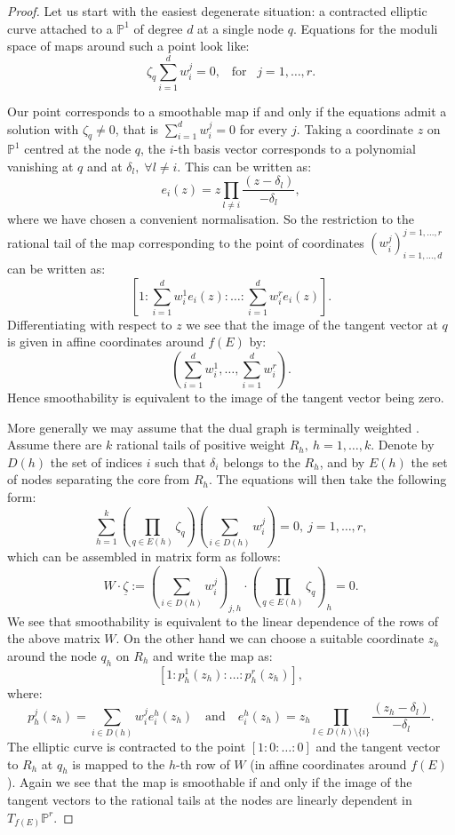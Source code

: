 \documentclass[11pt]{amsart}
\newcommand{\PP}{\mathbb P}
\theoremstyle{plain}
\theoremstyle{definition}
\begin{document}
\begin{proof}
 Let us start with the easiest degenerate situation: a contracted elliptic curve attached to a $\PP^1$ of degree $d$ at a single node $q$. Equations for the moduli space of maps around such a point look like: 
 \[\zeta_q\sum_{i=1}^d w_i^j=0,\;\;\;\text{for} \;\;\;j=1,\ldots,r.\]
 
 
  Our point corresponds to a smoothable map if and only if the equations admit a solution with $\zeta_q\neq 0$, that is $\sum_{i=1}^d w_i^j=0$ for every $j$. Taking a coordinate $z$ on  $\PP^1$ centred at the node $q$,   the $i$-th basis vector corresponds to a polynomial vanishing at $q$ and at $\delta_l,\;\forall l\neq i$. This can be written as:
  \[e_i(z)=z\prod_{l\neq i}\frac{(z-\delta_l)}{-\delta_l},\] 
  where we have chosen a convenient normalisation. So the restriction to the rational tail of the map corresponding to the point of coordinates $(w_i^j)_{i=1,\ldots,d}^{j=1,\ldots,r}$ can be written as:
  \[[1:\sum_{i=1}^d w_i^1e_i(z):\ldots:\sum_{i=1}^d w_i^re_i(z)].\] 
  Differentiating with respect to $z$ we see that the image of the tangent vector at $q$ is given in affine coordinates around $f(E)$ by:
  \[(\sum_{i=1}^d w_i^1,\ldots,\sum_{i=1}^d w_i^r).\] 
  Hence smoothability is equivalent to the image of the tangent vector being zero.
 
 More generally we may assume that the dual graph is terminally weighted \cite[\S 3.1]{HL}. Assume there are $k$  rational tails of positive weight $R_h,\ h=1,\ldots,k$. Denote by $D(h)$ the set of indices $i$ such that $\delta_i$ belongs to the $R_h$, and by $E(h)$ the set of nodes separating the core from $R_h$. The equations will then take the following form:
 \[\sum_{h=1}^k\left(\prod_{q\in E(h)}\zeta_q\right)\left(\sum_{i\in D(h)}w_i^j\right)=0,\ j=1,\ldots,r,\]
 which can be assembled in matrix form as follows:
 $$W\cdot\underline\zeta:=\left(\sum_{i\in D(h)}w_i^j\right)_{j,h}\cdot\left(\prod_{q\in E(h)}\zeta_q\right)_h=0.$$
 We see that smoothability is equivalent to the linear dependence of the rows of the above matrix $W$. On the other hand we can choose a suitable coordinate $z_h$ around the node $q_h$ on $R_h$ and write the map as: 
 \[[1:p_h^1(z_h):\ldots:p_h^r(z_h)],\]
  where: 
 \[p_h^j(z_h)=\sum_{i\in D(h)}w_i^je_i^h(z_h) \quad \text{and} \quad e_i^h(z_h)=z_h\prod_{l\in D(h)\setminus\{i\}}\frac{(z_h-\delta_l)}{-\delta_l}.\] The elliptic curve is contracted to the point $[1:0:\ldots:0]$ and the tangent vector to $R_h$ at $q_h$ is mapped to the $h$-th row of $W$ (in affine coordinates around $f(E)$). Again we see that the map is smoothable if and only if the image of the tangent vectors to the rational tails at the nodes are linearly dependent in $T_{f(E)}\PP^r$.
 \end{proof}
\end{document}

